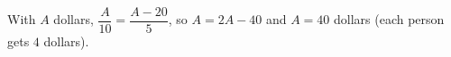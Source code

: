With $A$ dollars, $\dfrac A{10}=\dfrac{A-20}5$, so $A=2A-40$ and $A=\boxed{40}$ dollars (each person gets $4$ dollars).
